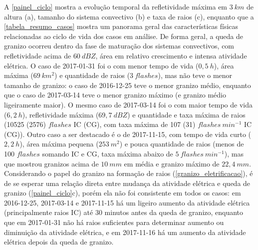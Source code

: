 A \autoref{painel_ciclo} mostra a evolução temporal da refletividade máxima em $3\:km$ de altura (a), tamanho do sistema convectivo (b) e taxa de raios (c), enquanto que a \autoref{tabela_resumo_casos} mostra um panorama geral das características físicas relacionadas ao ciclo de vida dos casos em análise. De forma geral, a queda de granizo ocorreu dentro da fase de maturação dos sistemas convectivos, com refletividade acima de $60\:dBZ$, área em relativo crescimento e intensa atividade elétrica. O caso de 2017-01-31 foi o com menor tempo de vida ($0,5\:h$), área máxima ($69\:km^2$) e quantidade de raios ($3\:flashes$), mas não teve o menor tamanho de granizo: o caso de 2016-12-25 teve o menor granizo médio, enquanto que o caso de 2017-03-14 teve o menor granizo máximo (e granizo médio ligeiramente maior). O mesmo caso de 2017-03-14 foi o com maior tempo de vida ($6,2\:h$), refletividade máxima ($69,7\:dBZ$) e quantidade e taxa máxima de raios (10525 (2576) $flashes$ IC (CG), com taxa máxima de 107 (31) $flashes\:min^{-1}$ IC (CG)). Outro caso a ser destacado é o de 2017-11-15, com tempo de vida curto ($2,2\:h$), área máxima pequena ($253\:m^2$) e pouca quantidade de raios (menos de 100 $flashes$ somando IC e CG, taxa máxima abaixo de $5\:flashes\:min^{-1}$), mas que mostrou granizos acima de $10\:mm$ em média e granizo máximo de $22,4\:mm$. Considerando o papel do granizo na formação de raios (\autoref{granizo_eletrificacao}), é de se esperar uma relação direta entre mudança da atividade elétrica e queda de granizo (\autoref{painel_ciclo}c), porém ela não foi consistente em todos os casos: em 2016-12-25, 2017-03-14 e 2017-11-15 há um ligeiro aumento da atividade elétrica (principalmente raios IC) até 30 minutos antes da queda de granizo, enquanto que em 2017-01-31 não há raios suficientes para determinar aumento ou diminuição da atividade elétrica, e em 2017-11-16 há um aumento da atividade elétrica depois da queda de granizo.

